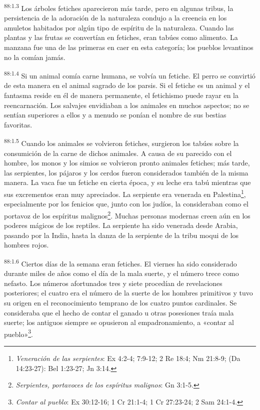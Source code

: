 \par
\textsuperscript{88:1.3} Los árboles fetiches aparecieron más tarde, pero en algunas tribus, la persistencia de la adoración de la naturaleza condujo a la creencia en los amuletos habitados por algún tipo de espíritu de la naturaleza. Cuando las plantas y las frutas se convertían en fetiches, eran tabúes como alimento. La manzana fue una de las primeras en caer en esta categoría; los pueblos levantinos no la comían jamás.

\par
\textsuperscript{88:1.4} Si un animal comía carne humana, se volvía un fetiche. El perro se convirtió de esta manera en el animal sagrado de los parsis. Si el fetiche es un animal y el fantasma reside en él de manera permanente, el fetichismo puede rayar en la reencarnación. Los salvajes envidiaban a los animales en muchos aspectos; no se sentían superiores a ellos y a menudo se ponían el nombre de sus bestias favoritas.

\par
\textsuperscript{88:1.5} Cuando los animales se volvieron fetiches, surgieron los tabúes sobre la consumición de la carne de dichos animales. A causa de su parecido con el hombre, los monos y los simios se volvieron pronto animales fetiches; más tarde, las serpientes, los pájaros y los cerdos fueron considerados también de la misma manera. La vaca fue un fetiche en cierta época, y su leche era tabú mientras que sus excrementos eran muy apreciados. La serpiente era venerada en Palestina\footnote{\textit{Veneración de las serpientes}: Ex 4:2-4; 7:9-12; 2 Re 18:4; Nm 21:8-9; (Da 14:23-27): Bel 1:23-27; Jn 3:14.}, especialmente por los fenicios que, junto con los judíos, la consideraban como el portavoz de los espíritus malignos\footnote{\textit{Serpientes, portavoces de los espíritus malignos}: Gn 3:1-5.}. Muchas personas modernas creen aún en los poderes mágicos de los reptiles. La serpiente ha sido venerada desde Arabia, pasando por la India, hasta la danza de la serpiente de la tribu moqui de los hombres rojos.

\par
\textsuperscript{88:1.6} Ciertos días de la semana eran fetiches. El viernes ha sido considerado durante miles de años como el día de la mala suerte, y el número trece como nefasto. Los números afortunados tres y siete procedían de revelaciones posteriores; el cuatro era el número de la suerte de los hombres primitivos y tuvo su origen en el reconocimiento temprano de los cuatro puntos cardinales. Se consideraba que el hecho de contar el ganado u otras posesiones traía mala suerte; los antiguos siempre se opusieron al empadronamiento, a «contar al pueblo»\footnote{\textit{Contar al pueblo}: Ex 30:12-16; 1 Cr 21:1-4; 1 Cr 27:23-24; 2 Sam 24:1-4.}.

